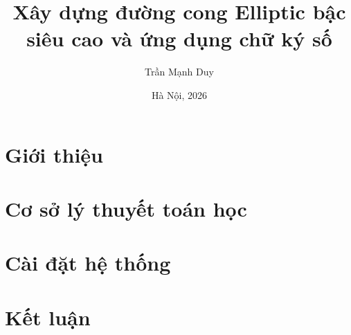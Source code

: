 \documentclass[aspectratio=169]{beamer}
\title{Xây dựng đường cong Elliptic bậc siêu cao và ứng dụng chữ ký số}
\author{Trần Mạnh Duy}
\institute{Trường Đại học Công nghệ -- ĐHQGHN}
\date{Hà Nội, 2026}
\begin{document}



\section{Giới thiệu}





\section{Cơ sở lý thuyết toán học}






\section{Cài đặt hệ thống}





\section{Kết luận}




\end{document}
